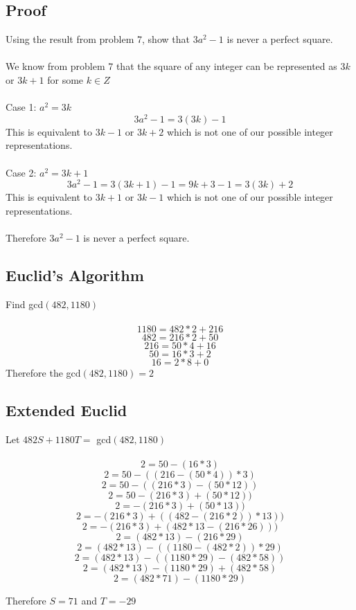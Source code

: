 \documentclass{article}
\begin{document}
\subsection{Proof}
Using the result from problem 7, show that $3a^2 - 1$ is never a perfect square.
\\\\
We know from problem 7 that the square of any integer can be represented as $3k$ or $3k+1$ for some $k \in Z$
\\\\
Case 1: $a^2 = 3k$
$$3a^2 - 1 = 3(3k) - 1$$
This is equivalent to $3k - 1$ or $3k+2$ which is not one of our possible integer representations.
\\\\
Case 2: $a^2 = 3k+1$
$$3a^2 - 1 = 3(3k+1) - 1 = 9k+3-1=3(3k) +2$$
This is equivalent to $3k + 1$ or $3k-1$ which is not one of our possible integer representations.\\\\
Therefore $3a^2 - 1$ is never a perfect square.

\subsection{Euclid's Algorithm}
Find gcd$(482,1180)$
\\\\
$$1180 = 482 * 2 + 216$$
$$482 = 216 * 2 + 50$$
$$216 = 50 * 4 + 16$$
$$50 = 16 * 3 + 2$$
$$16 = 2 * 8 + 0$$
Therefore the gcd$(482,1180) = 2$

\subsection{Extended Euclid}
Let $482S + 1180T =$ gcd$(482,1180)$
\\\\
$$2 = 50 - (16 * 3)$$
$$2 = 50 - ((216 - (50*4)) * 3)$$
$$2 = 50 - ((216*3) - (50*12))$$
$$2 = 50 - (216*3) + (50*12))$$
$$2 = -(216*3) + (50*13))$$
$$2 = -(216*3) + ((482-(216*2))*13))$$
$$2 = -(216*3) + (482*13-(216*26)))$$
$$2 = (482*13)-(216*29)$$
$$2 = (482*13)-((1180 - (482*2))*29)$$
$$2 = (482*13)-((1180*29) - (482*58))$$
$$2 = (482*13)-(1180*29) + (482*58)$$
$$2 = (482*71)-(1180*29)$$

Therefore $S = 71$ and $T=-29$
\end{document}
